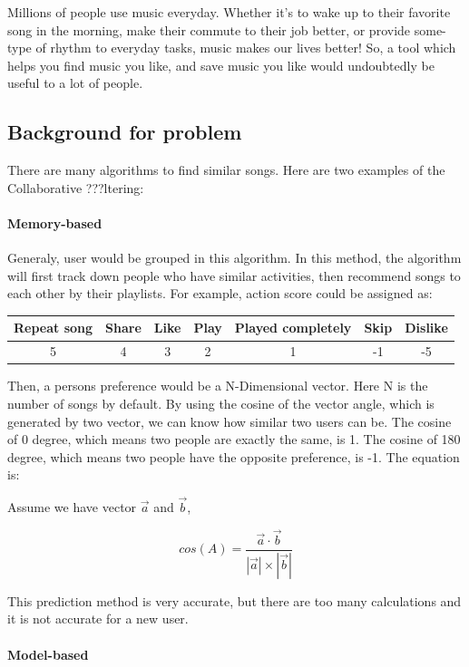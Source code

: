 \documentclass[]{article}
\let\oldparagraph\paragraph
\renewcommand{\paragraph}[1]{\oldparagraph{#1}\mbox{}}
\begin{document}
Millions of people use music everyday. Whether it's to wake up to their
favorite song in the morning, make their commute to their job better, or
provide some-type of rhythm to everyday tasks, music makes our lives
better! So, a tool which helps you find music you like, and save music
you like would undoubtedly be useful to a lot of people.

\subsection{Background for problem}\label{background-for-problem}

There are many algorithms to find similar songs. Here are two examples
of the Collaborative ???ltering:

\paragraph{Memory-based}\label{memory-based}

Generaly, user would be grouped in this algorithm. In this method, the
algorithm will first track down people who have similar activities, then
recommend songs to each other by their playlists. For example, action
score could be assigned as:

\begin{longtable}[]{@{}ccccccc@{}}
\toprule
Repeat song & Share & Like & Play & Played completely & Skip &
Dislike\tabularnewline
\midrule
\endhead
5 & 4 & 3 & 2 & 1 & -1 & -5\tabularnewline
\bottomrule
\end{longtable}

Then, a persons preference would be a N-Dimensional vector. Here N is
the number of songs by default. By using the cosine of the vector angle,
which is generated by two vector, we can know how similar two users can
be. The cosine of 0 degree, which means two people are exactly the same,
is 1. The cosine of 180 degree, which means two people have the opposite
preference, is -1. The equation is:

Assume we have vector \(\vec a\) and \(\vec b\),

\[cos(A) = \frac{\vec a \cdot \vec b}{|\vec a| \times |\vec b|}\]

This prediction method is very accurate, but there are too many
calculations and it is not accurate for a new user.

\paragraph{Model-based}\label{model-based}
\end{document}
